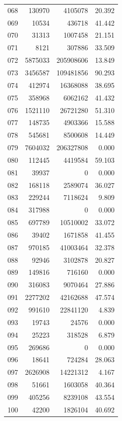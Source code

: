\documentclass[anonymous,notoc]{gmcm2026}
\begin{document}
\begin{longtable}{lrrr}
068 & 130970 & 4105078 & 20.392 \\
069 & 10534 & 436718 & 41.442 \\
070 & 31313 & 1007458 & 21.151 \\
071 & 8121 & 307886 & 33.509 \\
072 & 5875033 & 205908606 & 13.849 \\
073 & 3456587 & 109481856 & 90.293 \\
074 & 412974 & 16368088 & 38.695 \\
075 & 358968 & 6062162 & 41.432 \\
076 & 1521110 & 26721280 & 51.310 \\
077 & 148735 & 4903366 & 15.588 \\
078 & 545681 & 8500608 & 14.449 \\
079 & 7604032 & 206327808 & 0.000 \\
080 & 112445 & 4419584 & 59.103 \\
081 & 39937 & 0 & 0.000 \\
082 & 168118 & 2589074 & 36.027 \\
083 & 229244 & 7118624 & 9.809 \\
084 & 317988 & 0 & 0.000 \\
085 & 697789 & 10510002 & 33.072 \\
086 & 39402 & 1671858 & 41.455 \\
087 & 970185 & 41003464 & 32.378 \\
088 & 92946 & 3102878 & 20.827 \\
089 & 149816 & 716160 & 0.000 \\
090 & 316083 & 9070464 & 27.886 \\
091 & 2277202 & 42162688 & 47.574 \\
092 & 991610 & 22841120 & 4.839 \\
093 & 19743 & 24576 & 0.000 \\
094 & 25223 & 318528 & 6.879 \\
095 & 269686 & 0 & 0.000 \\
096 & 18641 & 724284 & 28.063 \\
097 & 2626908 & 14221312 & 4.167 \\
098 & 51661 & 1603058 & 40.364 \\
099 & 405256 & 8239108 & 43.554 \\
100 & 42200 & 1826104 & 40.692 \\
\end{longtable}
\end{document}
